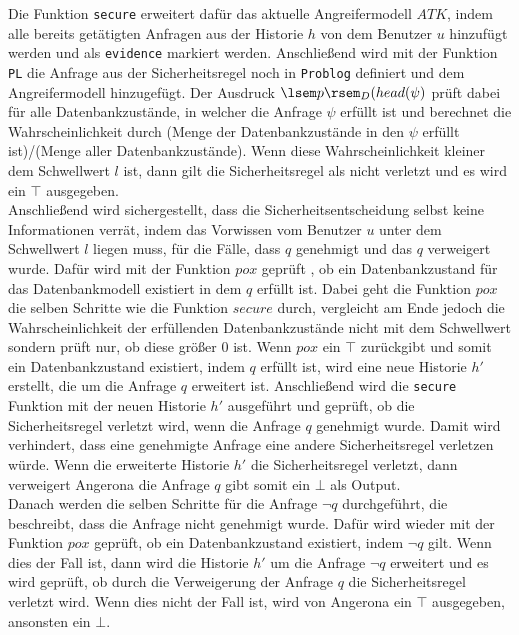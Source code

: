 \documentclass[german,version-2020-11]{uzl-thesis}
\begin{document}
Die Funktion \texttt{secure} erweitert dafür das aktuelle Angreifermodell $ATK$, indem alle bereits getätigten Anfragen aus der Historie $h$ von dem Benutzer $u$ hinzufügt werden und als \texttt{evidence} markiert werden. Anschließend wird mit der Funktion \texttt{PL} die Anfrage aus der Sicherheitsregel noch in \texttt{Problog} definiert und dem Angreifermodell hinzugefügt. Der Ausdruck $\lsem p \rsem_D (head(\psi)$ prüft dabei für alle Datenbankzustände, in welcher die Anfrage $\psi$ erfüllt ist und berechnet die Wahrscheinlichkeit durch (Menge der Datenbankzustände in den $\psi$ erfüllt ist)/(Menge aller Datenbankzustände). Wenn diese Wahrscheinlichkeit kleiner dem Schwellwert $l$ ist, dann gilt die Sicherheitsregel als nicht verletzt und es wird ein $\top$ ausgegeben. \\ 
Anschließend wird sichergestellt, dass die Sicherheitsentscheidung selbst keine Informationen verrät, indem das Vorwissen vom Benutzer $u$ unter dem Schwellwert $l$ liegen muss, für die Fälle, dass $q$ genehmigt und das $q$ verweigert wurde. Dafür wird mit der Funktion $pox$ geprüft , ob ein Datenbankzustand für das Datenbankmodell existiert in dem $q$ erfüllt ist. Dabei geht die Funktion $pox$ die selben Schritte wie die Funktion $secure$ durch, vergleicht am Ende jedoch die Wahrscheinlichkeit der erfüllenden Datenbankzustände nicht mit dem Schwellwert sondern prüft nur, ob diese größer 0 ist. Wenn $pox$ ein $\top$ zurückgibt und somit ein Datenbankzustand existiert, indem $q$ erfüllt ist, wird eine neue Historie $h'$ erstellt, die um die Anfrage $q$ erweitert ist. Anschließend wird die \texttt{secure} Funktion mit der neuen Historie $h'$ ausgeführt und geprüft, ob die Sicherheitsregel verletzt wird, wenn die Anfrage $q$ genehmigt wurde. Damit wird verhindert, dass eine genehmigte Anfrage eine andere Sicherheitsregel verletzen würde. Wenn die erweiterte Historie $h'$ die Sicherheitsregel verletzt, dann verweigert Angerona die Anfrage $q$ gibt somit ein $\bot$ als Output. \\ 
Danach werden die selben Schritte für die Anfrage $\neg q$ durchgeführt, die beschreibt, dass die Anfrage nicht genehmigt wurde. Dafür wird wieder mit der Funktion $pox$ geprüft, ob ein Datenbankzustand existiert, indem $ \neg q$ gilt. Wenn dies der Fall ist, dann wird die Historie $h'$ um die Anfrage $\neg q$ erweitert und es wird geprüft, ob durch die Verweigerung der Anfrage $q$ die Sicherheitsregel verletzt wird. Wenn dies nicht der Fall ist, wird von Angerona ein $\top$ ausgegeben, ansonsten ein $\bot$. \\ \\ 
\end{document}
